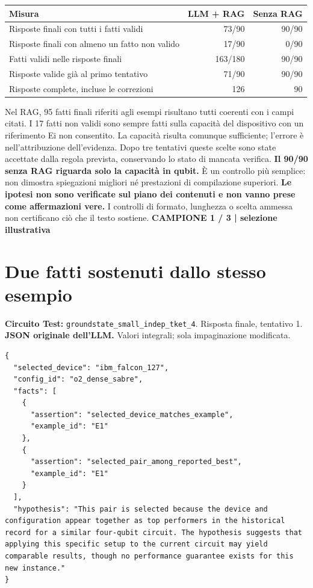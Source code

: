 \documentclass[a4paper,10pt]{article}
\newcommand{\tagline}[1]{{\small\color{ink}\textbf{#1}}\par}
\begin{document}
\begin{tabularx}{\linewidth}{Xrr}\toprule Misura & LLM + RAG & Senza RAG\\\midrule
Risposte finali con tutti i fatti validi & 73/90 & 90/90\\
Risposte finali con almeno un fatto non valido & 17/90 & 0/90\\
Fatti validi nelle risposte finali & 163/180 & 90/90\\
Risposte valide già al primo tentativo & 71/90 & 90/90\\
Risposte complete, incluse le correzioni & 126 & 90\\
\bottomrule\end{tabularx}
Nel RAG, 95 fatti finali riferiti agli esempi risultano tutti coerenti con i campi citati. I 17 fatti non validi sono sempre fatti sulla capacità del dispositivo con un riferimento Ei non consentito. La capacità risulta comunque sufficiente; l'errore è nell'attribuzione dell'evidenza. Dopo tre tentativi queste scelte sono state accettate dalla regola prevista, conservando lo stato di mancata verifica.
\textbf{Il 90/90 senza RAG riguarda solo la capacità in qubit.} È un controllo più semplice: non dimostra spiegazioni migliori né prestazioni di compilazione superiori.
\textbf{Le ipotesi non sono verificate sul piano dei contenuti e non vanno prese come affermazioni vere.} I controlli di formato, lunghezza o scelta ammessa non certificano ciò che il testo sostiene.
\newpage
\tagline{CAMPIONE 1 / 3 | selezione illustrativa}
\section*{Due fatti sostenuti dallo stesso esempio}
\textbf{Circuito Test:} \texttt{groundstate\_small\_indep\_tket\_4}. Risposta finale, tentativo 1.
\textbf{JSON originale dell'LLM.} Valori integrali; sola impaginazione modificata.
\begin{lstlisting}
{
  "selected_device": "ibm_falcon_127",
  "config_id": "o2_dense_sabre",
  "facts": [
    {
      "assertion": "selected_device_matches_example",
      "example_id": "E1"
    },
    {
      "assertion": "selected_pair_among_reported_best",
      "example_id": "E1"
    }
  ],
  "hypothesis": "This pair is selected because the device and configuration appear together as top performers in the historical record for a similar four-qubit circuit. The hypothesis suggests that applying this specific setup to the current circuit may yield comparable results, though no performance guarantee exists for this new instance."
}
\end{lstlisting}
\end{document}
